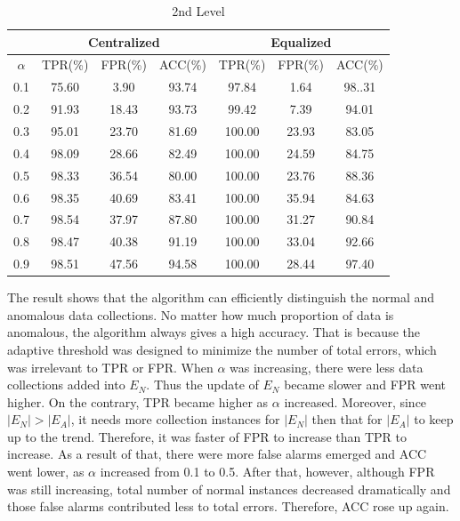 \documentclass[a4paper]{IEEEtran}
\begin{document}
			\begin{table}[!ht]
				\centering
				\caption{2nd Level}
				\label{tab:syn-result-2nd}
				\begin{tabular}{|c|c|c|c|c|c|c|}
					\hline
					& \multicolumn{3}{c|}{Centralized} & \multicolumn{3}{c|}{Equalized}\\
					\hline
					$\alpha$ & TPR(\%) & FPR(\%) & ACC(\%) & TPR(\%) & FPR(\%) & ACC(\%) \\ 
					\hline
					0.1 & 75.60 & 3.90 & 93.74 & 97.84 & 1.64 & 98..31 \\ 
					\hline
					0.2 & 91.93 & 18.43 & 93.73 & 99.42 & 7.39 & 94.01 \\ 
					\hline
					0.3 & 95.01 & 23.70 & 81.69 & 100.00 & 23.93 & 83.05 \\ 
					\hline
					0.4 & 98.09 & 28.66 & 82.49 & 100.00 & 24.59 & 84.75 \\ 
					\hline
					0.5 & 98.33 & 36.54 & 80.00 & 100.00 & 23.76 & 88.36 \\ 
					\hline
					0.6 & 98.35 & 40.69 & 83.41 & 100.00 & 35.94 & 84.63 \\ 
					\hline
					0.7 & 98.54 & 37.97 & 87.80 & 100.00 & 31.27 & 90.84 \\ 
					\hline
					0.8 & 98.47 & 40.38 & 91.19 & 100.00 & 33.04 & 92.66 \\ 
					\hline
					0.9 & 98.51 & 47.56 & 94.58 & 100.00 & 28.44 & 97.40\\
					\hline
				\end{tabular} 
			\end{table}
			
			The result shows that the algorithm can efficiently distinguish the normal and anomalous data collections. No matter how much proportion of data is anomalous, the algorithm always gives a high accuracy. That is because the adaptive threshold was designed to minimize the number of total errors, which was irrelevant to TPR or FPR. When $\alpha$ was increasing, there were less data collections added into $E_N$. Thus the update of $E_N$ became slower and FPR went higher. On the contrary, TPR became higher as $\alpha$ increased. Moreover, since $|E_N| > |E_A|$, it needs more collection instances for $|E_N|$ then that for $|E_A|$ to keep up to the trend. Therefore, it was faster of FPR to increase than TPR to increase. As a result of that, there were more false alarms emerged and ACC went lower, as $\alpha$ increased from 0.1 to 0.5. After that, however, although FPR was still increasing, total number of normal instances decreased dramatically and those false alarms contributed less to total errors. Therefore, ACC rose up again.
			
\end{document}
